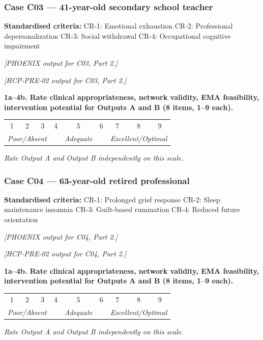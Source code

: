 \documentclass[11pt,a4paper]{article}
\makeatletter
\newcommand{\likertscale}[1]{%
\par\vspace{0.15em}%
\noindent\begin{tcolorbox}[colback=ScaleBG,colframe=BorderGrey,boxrule=0.4pt,arc=1mm,left=5pt,right=5pt,top=4pt,bottom=4pt]%
\small\textbf{\color{SlateMid}#1}\\[0.25em]%
\begin{tabular}{@{}*{9}{c}@{}}%
1 & 2 & 3 & 4 & 5 & 6 & 7 & 8 & 9 \\%
\multicolumn{3}{l}{\tiny\itshape Poor/Absent} & & \multicolumn{1}{c}{\tiny\itshape Adequate} & & \multicolumn{3}{r}{\tiny\itshape Excellent/Optimal}%
\end{tabular}%
\quad\textit{Rate Output A and Output B independently on this scale.}%
\end{tcolorbox}\vspace{0.1em}}
\makeatother
\begin{document}
\vspace{0.4em}

\subsubsection*{Case C03 --- 41-year-old secondary school teacher}
\begin{vignettebox}
\small\textbf{Standardised criteria:} CR-1: Emotional exhaustion \quad CR-2: Professional depersonalization \quad CR-3: Social withdrawal \quad CR-4: Occupational cognitive impairment
\end{vignettebox}
\begin{outputAbox}\small\textit{[PHOENIX output for C03, Part 2.]}\end{outputAbox}
\begin{outputBbox}\small\textit{[HCP-PRE-02 output for C03, Part 2.]}\end{outputBbox}
\begin{ratingbox}
\likertscale{1a--4b. Rate \textbf{clinical appropriateness, network validity, EMA feasibility, intervention potential} for Outputs A and B (8 items, 1--9 each).}
\end{ratingbox}

\vspace{0.4em}

\subsubsection*{Case C04 --- 63-year-old retired professional}
\begin{vignettebox}
\small\textbf{Standardised criteria:} CR-1: Prolonged grief response \quad CR-2: Sleep maintenance insomnia \quad CR-3: Guilt-based rumination \quad CR-4: Reduced future orientation
\end{vignettebox}
\begin{outputAbox}\small\textit{[PHOENIX output for C04, Part 2.]}\end{outputAbox}
\begin{outputBbox}\small\textit{[HCP-PRE-02 output for C04, Part 2.]}\end{outputBbox}
\begin{ratingbox}
\likertscale{1a--4b. Rate \textbf{clinical appropriateness, network validity, EMA feasibility, intervention potential} for Outputs A and B (8 items, 1--9 each).}
\end{ratingbox}

\vspace{0.4em}
\end{document}
